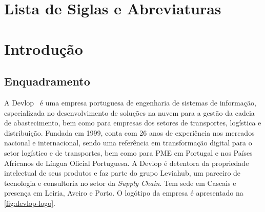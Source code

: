 \documentclass[a4paper,12pt]{report}
\begin{document}
\newpage
\chapter*{Lista de Siglas e Abreviaturas}

\begin{acronym}
\end{acronym}

\newpage

\setcounter{page}{1}
\pagestyle{mystyle}

\chapter{Introdução}

\section{Enquadramento}

A Devlop~\cite{devlop} é uma empresa portuguesa de engenharia de sistemas de informação, especializada no desenvolvimento de soluções na nuvem para a gestão da cadeia de abastecimento, bem como para empresas dos setores de transportes, logística e distribuição. Fundada em 1999, conta com 26 anos de experiência nos mercados nacional e internacional, sendo uma referência em transformação digital para o setor logístico e de transportes, bem como para PME em Portugal e nos Países Africanos de Língua Oficial Portuguesa. A Devlop é detentora da propriedade intelectual de seus produtos e faz parte do grupo Leviahub, um parceiro de tecnologia e consultoria no setor da \textit{Supply Chain}. Tem sede em Cascais e presença em Leiria, Aveiro e Porto. O logótipo da empresa é apresentado na \autoref{fig:devlop-logo}.
\end{document}
